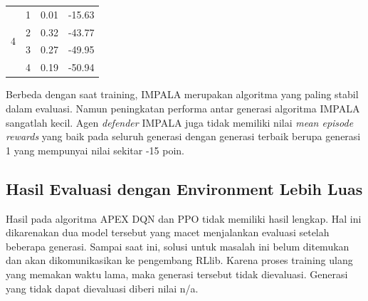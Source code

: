 \begin{table}[H]
\begin{tabular}{|c|c|l|l|}
  \multirow{4}{*}{4}                                                           & 1                                                                            & 0.01                                                                             & -15.63                                                                           \\ \cline{2-4} 
                                                                               & 2                                                                            & 0.32                                                                             & -43.77                                                                           \\ \cline{2-4} 
                                                                               & 3                                                                            & 0.27                                                                             & -49.95                                                                           \\ \cline{2-4} 
                                                                               & 4                                                                            & 0.19                                                                             & -50.94                                                                           \\ \hline
  \end{tabular}
\end{table}

Berbeda dengan saat training, IMPALA merupakan algoritma yang paling stabil dalam evaluasi.
Namun peningkatan performa antar generasi algoritma IMPALA sangatlah kecil.
Agen \emph{defender} IMPALA juga tidak memiliki nilai \emph{mean episode rewards} yang baik pada seluruh generasi
dengan generasi terbaik berupa generasi 1 yang mempunyai nilai sekitar -15 poin.

\subsection{Hasil Evaluasi dengan Environment Lebih Luas}

Hasil pada algoritma APEX DQN dan PPO tidak memiliki hasil lengkap. 
Hal ini dikarenakan dua model tersebut yang macet menjalankan evaluasi setelah beberapa generasi.
Sampai saat ini, solusi untuk masalah ini belum ditemukan dan akan dikomunikasikan ke pengembang RLlib.
Karena proses training ulang yang memakan waktu lama, maka generasi tersebut tidak dievaluasi.
Generasi yang tidak dapat dievaluasi diberi nilai n/a.

